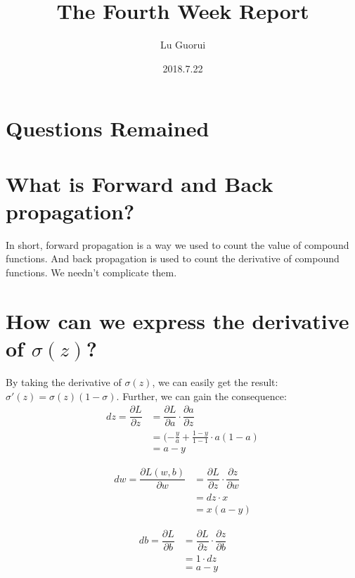 \documentclass{article}
\title{The Fourth Week Report}
\author{Lu Guorui}
\date{2018.7.22}
\begin{document}
\maketitle
\renewcommand{\contentsname}{Contents}
\tableofcontents
\newpage

\section*{Questions Remained}

\section{What is Forward and Back propagation?}
\indent In short, forward propagation is a way we used to count the value of compound functions. And back propagation is used to count the derivative of compound functions. We needn't complicate them.

\section{How can we express the derivative of $\sigma(z)$?}
\indent By taking the derivative of $\sigma(z)$, we can easily get the result:$\sigma'(z)=\sigma(z)(1-\sigma)$.
\indent Further, we can gain the consequence:
\begin{align}
dz = \dfrac{\partial L}{\partial z} &= \dfrac{\partial L}{\partial a}\cdot\dfrac{\partial a}{\partial z}  \\
&= (-\frac{y}{a}+\frac{1-y}{1-1}\cdot a(1-a) \\
&= a-y
\end{align}

\begin{align}
dw = \dfrac{\partial L(w,b)}{\partial w}&=\dfrac{\partial L}{\partial z}\cdot\dfrac{\partial z}{\partial w} \\
&=dz\cdot x  \\
&=x(a-y) 
\end{align}

\begin{align}
db = \dfrac{\partial L}{\partial b} &=\dfrac{\partial L}{\partial z}\cdot\dfrac{\partial z}{\partial b}  \\
&= 1\cdot dz \\
&= a-y
\end{align}

\hypersetup{
	bookmarks=true,
	colorlinks=true,
	linkcolor=red
	}
\end{document}
